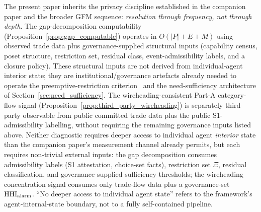 The present paper inherits the privacy discipline established
in the companion paper and the broader GFM sequence:
\emph{resolution through frequency, not through depth}.  The
gap-decomposition computability
(Proposition~\ref{prop:gap_computable}) operates in $O(|P| + E
+ M)$ using observed trade data plus governance-supplied
structural inputs (capability census, poset structure,
restriction set, residual class, event-admissibility labels,
and a closure policy).  These structural inputs are not derived
from individual-agent interior state; they are
institutional/governance artefacts already needed to operate
the preemptive-restriction
criterion~\citep[Proposition~1]{lasser2026horizon} and the
need-sufficiency architecture of
Section~\ref{sec:need_sufficiency}.  The
wireheading-consistent Part-A category-flow signal
(Proposition~\ref{prop:third_party_wireheading}) is separately
third-party observable from public committed trade data plus
the public S1-admissibility labelling, without requiring the
remaining governance inputs listed above.  Neither
diagnostic requires deeper access to individual agent
\emph{interior} state than the companion paper's measurement
channel already permits, but each requires non-trivial
external inputs: the gap decomposition consumes admissibility
labels (S1 attestation, choice-set facts), restriction set
$\Xi$, residual classification, and governance-supplied
sufficiency thresholds; the wireheading concentration signal
consumes only trade-flow data plus a governance-set
$\mathrm{HHI}_{\mathrm{alarm}}$.  ``No deeper access to individual
agent state'' refers to the framework's agent-internal-state
boundary, not to a fully self-contained pipeline.
